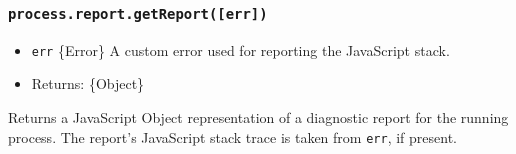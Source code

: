 \subsubsection{\texorpdfstring{\texttt{process.report.getReport({[}err{]})}}{process.report.getReport({[}err{]})}}\label{process.report.getreporterr}

\begin{itemize}
\tightlist
\item
  \texttt{err} \{Error\} A custom error used for reporting the
  JavaScript stack.
\item
  Returns: \{Object\}
\end{itemize}

Returns a JavaScript Object representation of a diagnostic report for
the running process. The report's JavaScript stack trace is taken from
\texttt{err}, if present.

\begin{Shaded}
\begin{Highlighting}[]
 \OperatorTok{;}
 \OperatorTok{;}

\OperatorTok{=}\NormalTok{()}\OperatorTok{;}
\NormalTok{)}\OperatorTok{;}

 \OperatorTok{;}
\NormalTok{(}\OperatorTok{,}\OperatorTok{,} \NormalTok{)}\OperatorTok{;}
\end{Highlighting}
\end{Shaded}

